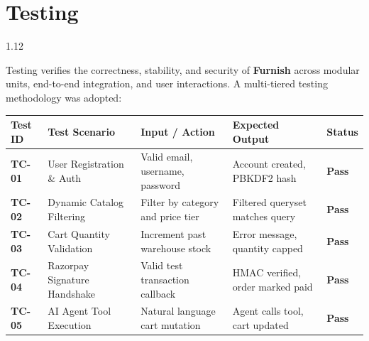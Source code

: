\documentclass[12pt,a4paper]{article}
\begin{document}
\newpage



\section{Testing}

\vspace{0.06in}

{\fontsize{12.5}{17}\selectfont
\begin{spacing}{1.12}

\noindent
Testing verifies the correctness, stability, and security of \textbf{Furnish} across modular units, end-to-end integration, and user interactions. A multi-tiered testing methodology was adopted:

\vspace{0.06in}

\begin{center}
\renewcommand{\arraystretch}{1.15}
\fontsize{9}{12}\selectfont
\begin{tabular}{|p{0.6in}|p{1.9in}|p{1.9in}|p{1.2in}|p{0.6in}|}
\hline
\textbf{Test ID} & \textbf{Test Scenario} & \textbf{Input / Action} & \textbf{Expected Output} & \textbf{Status} \\ \hline
\textbf{TC-01} & User Registration \& Auth & Valid email, username, password & Account created, PBKDF2 hash & \textbf{Pass} \\ \hline
\textbf{TC-02} & Dynamic Catalog Filtering & Filter by category and price tier & Filtered queryset matches query & \textbf{Pass} \\ \hline
\textbf{TC-03} & Cart Quantity Validation & Increment past warehouse stock & Error message, quantity capped & \textbf{Pass} \\ \hline
\textbf{TC-04} & Razorpay Signature Handshake & Valid test transaction callback & HMAC verified, order marked paid & \textbf{Pass} \\ \hline
\textbf{TC-05} & AI Agent Tool Execution & Natural language cart mutation & Agent calls tool, cart updated & \textbf{Pass} \\ \hline
\end{tabular}
\end{center}

\end{spacing}
}

\vspace{0.10in}
\end{document}
